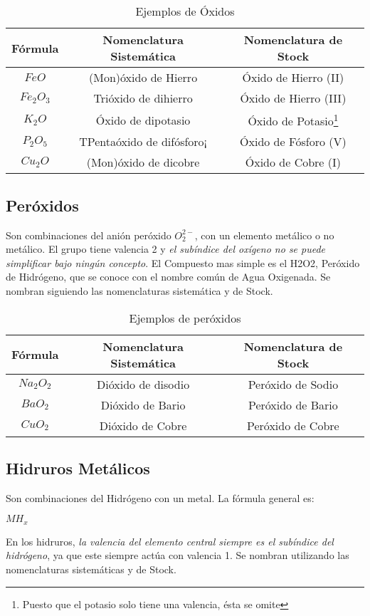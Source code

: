 \documentclass[11pt,fleqn]{book} %
\begin{document}
\begin{table}[h!]
	\centering
	\begin{tabular}{c|cc}
		Fórmula&Nomenclatura Sistemática&Nomenclatura de Stock\\ \hline
		$FeO$&(Mon)óxido de Hierro&Óxido de Hierro (II)\\
		$Fe_{2}O_{3}$&Trióxido de dihierro&Óxido de Hierro (III)\\
		$K_{2}O$&Óxido de dipotasio&Óxido de Potasio\footnote{Puesto que el potasio solo tiene una valencia, ésta se omite }\\
		$P_{2}O_{5}$&TPentaóxido de difósforo¡&Óxido de Fósforo (V)\\
		$Cu_{2}O$&(Mon)óxido de dicobre&Óxido de Cobre (I)\\ \hline
	\end{tabular}
	\caption{Ejemplos de Óxidos}
\end{table}

\subsection{Peróxidos}
Son combinaciones del anión peróxido $O^{2-}_2$, con un elemento metálico o no metálico. El grupo tiene valencia 2 y \emph{el subíndice del oxígeno no se puede simplificar bajo ningún concepto}. El Compuesto mas simple es el H2O2, Peróxido de Hidrógeno, que se conoce con el nombre común de Agua Oxigenada. Se nombran siguiendo las nomenclaturas sistemática y de Stock. 
\begin{table}[h!]
	\centering
	\begin{tabular}{c|cc}
		Fórmula&Nomenclatura Sistemática&Nomenclatura de Stock\\ \hline
		$Na_{2}O_{2}$&Dióxido de disodio&Peróxido de Sodio\\ 
		$BaO_{2}$&Dióxido de Bario&Peróxido de Bario\\
		$CuO_{2}$&Dióxido de Cobre&Peróxido de Cobre\\ \hline
	\end{tabular}
	\caption{Ejemplos de peróxidos}
\end{table}

\subsection{Hidruros Metálicos}
Son combinaciones del Hidrógeno con un metal. La fórmula general es:\\
\begin{center}
	$MH_x$
\end{center}
En los hidruros, \emph{la valencia del elemento central siempre es el subíndice del hidrógeno}, ya que este siempre actúa con valencia 1. Se nombran utilizando las nomenclaturas sistemáticas y de Stock.
\end{document}
